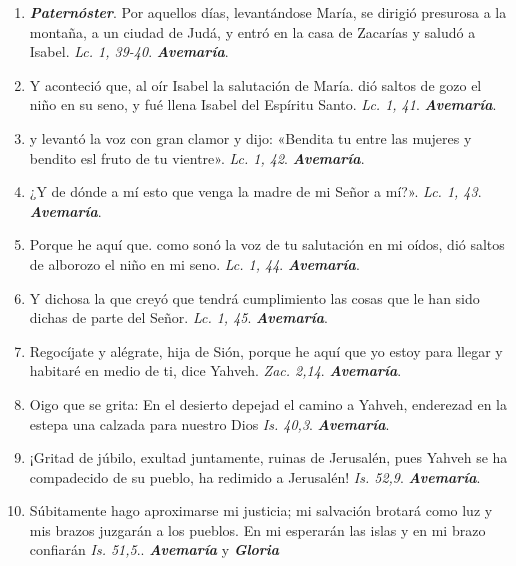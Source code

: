 \documentclass[./rosary.tex]{subfiles}
\begin{document}
\begin{enumerate}
    \item \textbf{\emph{Paternóster}}. Por aquellos días, levantándose María, se dirigió presurosa a la montaña, a un ciudad de Judá, y entró en la casa de Zacarías y saludó a Isabel. \emph{Lc. 1, 39-40}. \textbf{\emph{Avemaría}}.

    \item Y aconteció que, al oír Isabel la salutación de María. dió saltos de gozo el niño en su seno, y fué llena Isabel del Espíritu Santo. \emph{Lc. 1, 41}. \textbf{\emph{Avemaría}}.

    \item y levantó la voz con gran clamor y dijo: «Bendita tu entre las mujeres y bendito esl fruto de tu vientre». \emph{Lc. 1, 42}. \textbf{\emph{Avemaría}}.

    \item ¿Y de dónde a mí esto que venga la madre de mi Señor a mí?». \emph{Lc. 1, 43}. \textbf{\emph{Avemaría}}.

    \item Porque he aquí que. como sonó la voz de tu salutación en mi oídos, dió saltos de alborozo el niño en mi seno. \emph{Lc. 1, 44}. \textbf{\emph{Avemaría}}.

    \item Y dichosa la que creyó que tendrá cumplimiento las cosas que le han sido dichas de parte del Señor. \emph{Lc. 1, 45}. \textbf{\emph{Avemaría}}.

    \item Regocíjate y alégrate, hija de Sión, porque he aquí que yo estoy para llegar y habitaré en medio de ti, dice Yahveh. \emph{Zac. 2,14}. \textbf{\emph{Avemaría}}.

    \item Oigo que se grita: En el desierto depejad el camino a Yahveh, enderezad en la estepa una calzada para nuestro Dios \emph{Is. 40,3}. \textbf{\emph{Avemaría}}.

    \item ¡Gritad de júbilo, exultad juntamente, ruinas de Jerusalén, pues Yahveh se ha compadecido de su pueblo, ha redimido a Jerusalén! \emph{Is. 52,9}. \textbf{\emph{Avemaría}}.

    \item Súbitamente hago aproximarse mi justicia; mi salvación brotará como luz y mis brazos juzgarán a los pueblos. En mi esperarán las islas y en mi brazo confiarán \emph{Is. 51,5}.. \textbf{\emph{Avemaría}} y \textbf{\emph{Gloria}}
\end{enumerate}
\end{document}
